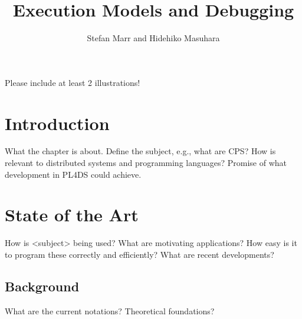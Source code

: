 %

\begin{bibunit}
	
	\title*{Execution Models and Debugging}
	\author{Stefan Marr and Hidehiko Masuhara}
	
	\maketitle
	
	
\begin{note}
Please include at least 2 illustrations!
\end{note}

\section{Introduction}

\begin{note}
[up to 2 pages]
What the chapter is about. Define the subject, e.g., what are CPS?
How is relevant to distributed systems and programming languages?
Promise of what development in PL4DS could achieve.
\end{note}

\section{State of the Art}

\begin{note}
[up to 10 pages]
How is <subject> being used? What are motivating applications? How easy is it to program these correctly and efficiently?
What are recent developments?
\end{note}

\subsection{Background}
\begin{note}
What are the current notations? Theoretical foundations?
\end{note}


\end{bibunit}
